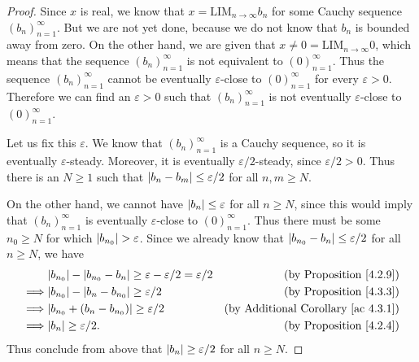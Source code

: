 \begin{proof}
    Since \(x\) is real, we know that \(x = \text{LIM}_{n \to \infty} b_n\) for some Cauchy sequence \((b_n)_{n = 1}^{\infty}\).
    But we are not yet done, because we do not know that \(b_n\) is bounded away from zero.
    On the other hand, we are given that \(x \neq 0 = \text{LIM}_{n \to \infty} 0\), which means that the sequence \((b_n)_{n = 1}^{\infty}\) is not equivalent to \((0)_{n = 1}^{\infty}\).
    Thus the sequence \((b_n)_{n = 1}^{\infty}\) cannot be eventually \(\varepsilon\)-close to \((0)_{n = 1}^{\infty}\) for every \(\varepsilon > 0\).
    Therefore we can find an \(\varepsilon > 0\) such that \((b_n)_{n = 1}^{\infty}\) is not eventually \(\varepsilon\)-close to \((0)_{n = 1}^{\infty}\).

    Let us fix this \(\varepsilon\).
    We know that \((b_n)_{n = 1}^{\infty}\) is a Cauchy sequence, so it is eventually \(\varepsilon\)-steady.
    Moreover, it is eventually \(\varepsilon / 2\)-steady, since \(\varepsilon / 2 > 0\).
    Thus there is an \(N \geq 1\) such that \(\abs*{b_n - b_m} \leq \varepsilon / 2\) for all \(n, m \geq N\).

    On the other hand, we cannot have \(\abs*{b_n} \leq \varepsilon\) for all \(n \geq N\), since this would imply that \((b_n)_{n = 1}^{\infty}\) is eventually \(\varepsilon\)-close to \((0)_{n = 1}^{\infty}\).
    Thus there must be some \(n_0 \geq N\) for which \(\abs*{b_{n_0}} > \varepsilon\).
    Since we already know that \(\abs*{b_{n_0} - b_n} \leq \varepsilon / 2\) for all \(n \geq N\), we have
    \begin{align*}
                 & \abs*{b_{n_0}} - \abs*{b_{n_0} - b_n} \geq \varepsilon - \varepsilon / 2 = \varepsilon / 2 & \text{(by Proposition \ref{4.2.9})}             \\
        \implies & \abs*{b_{n_0}} - \abs*{b_n - b_{n_0}} \geq \varepsilon / 2                                 & \text{(by Proposition \ref{4.3.3})}             \\
        \implies & \abs*{b_{n_0} + (b_n - b_{n_0})} \geq \varepsilon / 2                                      & \text{(by Additional Corollary \ref{ac 4.3.1})} \\
        \implies & \abs*{b_n} \geq \varepsilon / 2.                                                           & \text{(by Proposition \ref{4.2.4})}             \\
    \end{align*}
    Thus conclude from above that \(\abs*{b_n} \geq \varepsilon / 2\) for all \(n \geq N\).


\end{proof}
